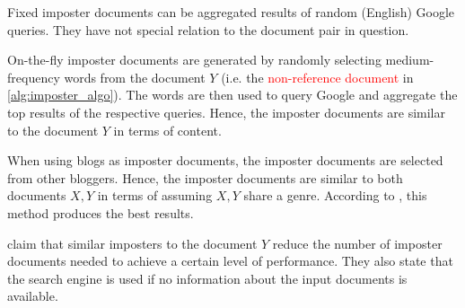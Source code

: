 Fixed imposter documents can be aggregated results of random (English) Google queries.
They have not special relation to the document pair in question.

On-the-fly imposter documents are generated by randomly selecting medium-frequency words from the document $Y$ (i.e. the \textcolor{red}{non-reference document} in \autoref{alg:imposter_algo}).
The words are then used to query Google and aggregate the top results of the respective queries. 
Hence, the imposter documents are similar to the document $Y$ in terms of content.

When using blogs as imposter documents, the imposter documents are selected from other bloggers. 
Hence, the imposter documents are similar to both documents $X,Y$ in terms of assuming $X,Y$ share a genre.
According to \citet{koppel_determining_2014}, this method produces the best results.

\citet{koppel_determining_2014} claim that similar imposters to the document $Y$ reduce the number of imposter documents needed to achieve a certain level of performance.
They also state that the search engine is used if no information about the input documents is available.
